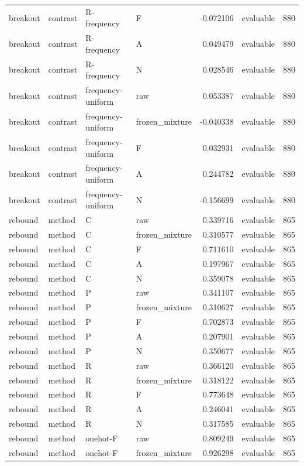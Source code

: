 \begin{longtable}{llllrlr}
breakout & contrast & R-frequency & F & -0.072106 & evaluable & 880 \\
breakout & contrast & R-frequency & A & 0.049479 & evaluable & 880 \\
breakout & contrast & R-frequency & N & 0.028546 & evaluable & 880 \\
breakout & contrast & frequency-uniform & raw & 0.053387 & evaluable & 880 \\
breakout & contrast & frequency-uniform & frozen\_mixture & -0.040338 & evaluable & 880 \\
breakout & contrast & frequency-uniform & F & 0.032931 & evaluable & 880 \\
breakout & contrast & frequency-uniform & A & 0.244782 & evaluable & 880 \\
breakout & contrast & frequency-uniform & N & -0.156699 & evaluable & 880 \\
rebound & method & C & raw & 0.339716 & evaluable & 865 \\
rebound & method & C & frozen\_mixture & 0.310577 & evaluable & 865 \\
rebound & method & C & F & 0.711610 & evaluable & 865 \\
rebound & method & C & A & 0.197967 & evaluable & 865 \\
rebound & method & C & N & 0.359078 & evaluable & 865 \\
rebound & method & P & raw & 0.341107 & evaluable & 865 \\
rebound & method & P & frozen\_mixture & 0.310627 & evaluable & 865 \\
rebound & method & P & F & 0.702873 & evaluable & 865 \\
rebound & method & P & A & 0.207901 & evaluable & 865 \\
rebound & method & P & N & 0.350677 & evaluable & 865 \\
rebound & method & R & raw & 0.366120 & evaluable & 865 \\
rebound & method & R & frozen\_mixture & 0.318122 & evaluable & 865 \\
rebound & method & R & F & 0.773648 & evaluable & 865 \\
rebound & method & R & A & 0.246041 & evaluable & 865 \\
rebound & method & R & N & 0.317585 & evaluable & 865 \\
rebound & method & onehot-F & raw & 0.809249 & evaluable & 865 \\
rebound & method & onehot-F & frozen\_mixture & 0.926298 & evaluable & 865 \\

\end{longtable}
